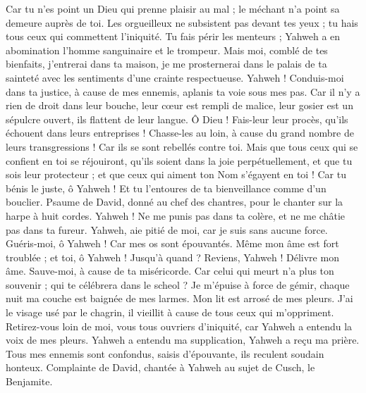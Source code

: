 \begin{multicols}{2}
Car tu n'es point un Dieu qui prenne plaisir au mal ; le méchant n'a point sa demeure auprès de toi.
Les orgueilleux ne subsistent pas devant tes yeux ; tu hais tous ceux qui commettent l'iniquité.
Tu fais périr les menteurs ; Yahweh a en abomination l'homme sanguinaire et le trompeur.
Mais moi, comblé de tes bienfaits, j'entrerai dans ta maison, je me prosternerai dans le palais de ta sainteté avec les sentiments d'une crainte respectueuse.
Yahweh ! Conduis-moi dans ta justice, à cause de mes ennemis, aplanis ta voie sous mes pas.
Car il n'y a rien de droit dans leur bouche, leur cœur est rempli de malice, leur gosier est un sépulcre ouvert, ils flattent de leur langue.
Ô Dieu ! Fais-leur leur procès, qu'ils échouent dans leurs entreprises ! Chasse-les au loin, à cause du grand nombre de leurs transgressions ! Car ils se sont rebellés contre toi.
Mais que tous ceux qui se confient en toi se réjouiront, qu'ils soient dans la joie perpétuellement, et que tu sois leur protecteur ; et que ceux qui aiment ton Nom s'égayent en toi !
Car tu bénis le juste, ô Yahweh ! Et tu l'entoures de ta bienveillance comme d'un bouclier.
\VerseOne{}Psaume de David, donné au chef des chantres, pour le chanter sur la harpe à huit cordes.
Yahweh ! Ne me punis pas dans ta colère, et ne me châtie pas dans ta fureur.
Yahweh, aie pitié de moi, car je suis sans aucune force. Guéris-moi, ô Yahweh ! Car mes os sont épouvantés.
Même mon âme est fort troublée ; et toi, ô Yahweh ! Jusqu'à quand ?
Reviens, Yahweh ! Délivre mon âme. Sauve-moi, à cause de ta miséricorde.
Car celui qui meurt n'a plus ton souvenir ; qui te célébrera dans le scheol ?
Je m'épuise à force de gémir, chaque nuit ma couche est baignée de mes larmes. Mon lit est arrosé de mes pleurs.
J'ai le visage usé par le chagrin, il vieillit à cause de tous ceux qui m'oppriment.
Retirez-vous loin de moi, vous tous ouvriers d'iniquité, car Yahweh a entendu la voix de mes pleurs.
Yahweh a entendu ma supplication, Yahweh a reçu ma prière.
Tous mes ennemis sont confondus, saisis d'épouvante, ils reculent soudain honteux.
\VerseOne{}Complainte de David, chantée à Yahweh au sujet de Cusch, le Benjamite.

\end{multicols}
